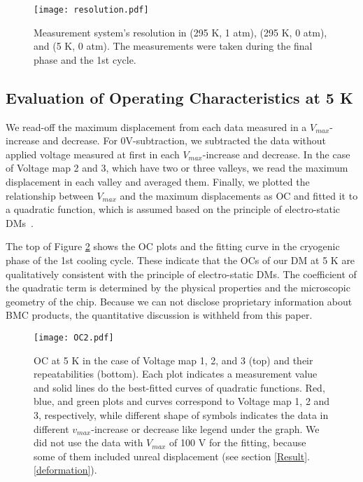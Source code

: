 \documentclass[a4paper]{article}
\begin{document}
\begin{figure}[htbp]
\centering
\texttt{[image: resolution.pdf]}
\caption{Measurement system's resolution in (295 K, 1 atm), (295 K, 0 atm), and (5 K, 0 atm). The measurements were taken during the final phase and the 1st cycle.}
\label{resolution}
\end{figure}

\subsection{Evaluation of Operating Characteristics at 5 K}
We read-off the maximum displacement from each data measured in a $V_{max}$-increase and decrease. For 0V-subtraction, we subtracted the data without applied voltage measured at first in each $V_{max}$-increase and decrease. In the case of Voltage map 2 and 3, which have two or three valleys, we read the maximum displacement in each valley and averaged them. Finally, we plotted the relationship between $V_{max}$ and the maximum displacements as OC and fitted it to a quadratic function, which is assumed based on the principle of electro-static DMs~\cite{MEMS}.

The top of Figure \ref{vmall_5K_0atm_OC} shows the OC plots and the fitting curve in the cryogenic phase of the 1st cooling cycle. These indicate that the OCs of our DM at 5 K are qualitatively consistent with the principle of electro-static DMs. The coefficient of the quadratic term is determined by the physical properties and the microscopic geometry of the chip. Because we can not disclose proprietary information about BMC products, the quantitative discussion is withheld from this paper.

\begin{figure}[htbp]
\centering
\texttt{[image: OC2.pdf]}
\caption{OC at 5 K in the case of Voltage map 1, 2, and 3 (top) and their repeatabilities (bottom). Each plot indicates a measurement value and solid lines do the best-fitted curves of quadratic functions. Red, blue, and green plots and curves correspond to Voltage map 1, 2 and 3, respectively, while different shape of symbols indicates the data in different $v_{max}$-increase or decrease like legend under the graph. We did not use the data with $V_{max}$ of 100 V for the fitting, because some of them included unreal displacement (see section \ref{Result}.\ref{deformation}).}
\label{vmall_5K_0atm_OC}
\end{figure}
\end{document}
